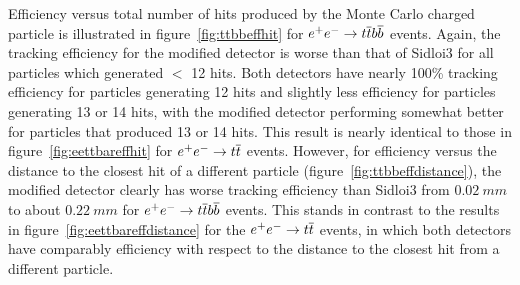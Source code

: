 Efficiency versus total number of hits produced by the Monte Carlo charged particle
is illustrated in figure~\ref{fig:ttbbeffhit} for $\ee \rightarrow \ttbar \bbbar$ events.
Again, the tracking efficiency for the modified detector is worse than that of Sidloi3 for all particles
which generated $<$ 12 hits.
Both detectors have nearly 100\% tracking efficiency for particles generating 12 hits
and slightly less efficiency for particles generating 13 or 14 hits, with the modified detector
performing somewhat better for particles that produced 13 or 14 hits.
This result is nearly identical to those in figure~\ref{fig:eettbareffhit} for $\ee \rightarrow \ttbar$ events.
However, for efficiency versus the distance to the closest hit of a different particle (figure~\ref{fig:ttbbeffdistance}),
the modified detector clearly has worse tracking efficiency than Sidloi3
 from $0.02~mm$ to about $0.22~mm$ for $\ee \rightarrow \ttbar \bbbar$ events.
This stands in contrast to the results in figure~\ref{fig:eettbareffdistance} for the  
$\ee \rightarrow \ttbar$ events, in which both detectors have comparably efficiency with respect to the distance to 
the closest hit from a different particle.

